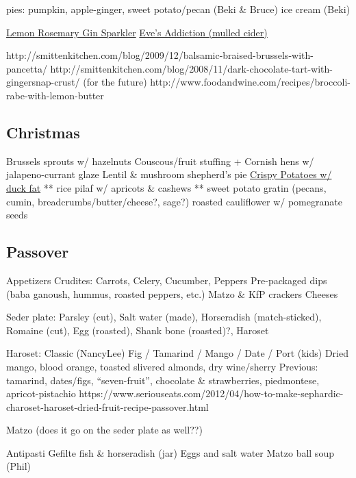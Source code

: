 pies: pumpkin, apple-ginger, sweet potato/pecan (Beki \& Bruce)
ice cream (Beki)

\href{https://www.seriouseats.com/recipes/2014/11/gin-cocktail-for-crowds-charred-lemon-rosemary-drink-recipe.html}{Lemon Rosemary Gin Sparkler}
\href{https://www.seriouseats.com/recipes/2013/11/eves-addiction-hot-mulled-cider-recipe.html}{Eve's Addiction (mulled cider)}

http://smittenkitchen.com/blog/2009/12/balsamic-braised-brussels-with-pancetta/
http://smittenkitchen.com/blog/2008/11/dark-chocolate-tart-with-gingersnap-crust/ (for the future)
http://www.foodandwine.com/recipes/broccoli-rabe-with-lemon-butter

\subsection{Christmas}
Brussels sprouts w/ hazelnuts
Couscous/fruit stuffing + Cornish hens w/ jalapeno-currant glaze
Lentil \& mushroom shepherd's pie
\href{http://www.seriouseats.com/recipes/2011/11/ultra-crispy-roast-potatoes-recipe.html}{Crispy Potatoes w/ duck fat}
** rice pilaf w/ apricots \& cashews
** sweet potato gratin (pecans, cumin, breadcrumbs/butter/cheese?, sage?)
roasted cauliflower w/ pomegranate seeds

\subsection{Passover}
Appetizers
Crudites: Carrots, Celery, Cucumber, Peppers
Pre-packaged dips (baba ganoush, hummus, roasted peppers, etc.)
Matzo \& KfP crackers
Cheeses

Seder plate: Parsley (cut), Salt water (made), Horseradish (match-sticked), Romaine (cut), Egg (roasted), Shank bone (roasted)?, Haroset

Haroset: Classic (NancyLee)
Fig / Tamarind / Mango / Date / Port (kids)
Dried mango, blood orange, toasted slivered almonds, dry wine/sherry
Previous: tamarind, dates/figs, “seven-fruit”, chocolate \& strawberries, piedmontese, apricot-pistachio
https://www.seriouseats.com/2012/04/how-to-make-sephardic-charoset-haroset-dried-fruit-recipe-passover.html

Matzo (does it go on the seder plate as well??)

Antipasti
Gefilte fish \& horseradish (jar)
Eggs and salt water
Matzo ball soup (Phil)

